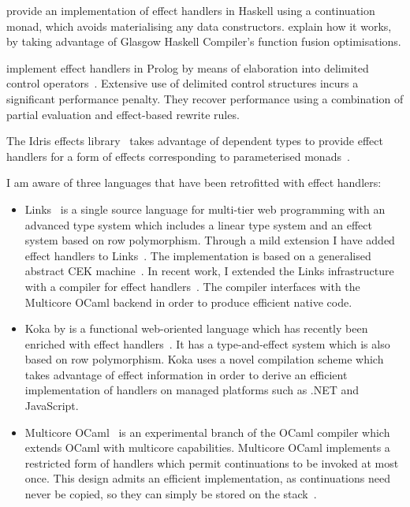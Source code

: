 \documentclass[preprint,9pt,numbers]{sigplanconf}
\begin{document}
\citet{KammarLO13} provide an implementation of effect handlers in
Haskell using a continuation monad, which avoids materialising any
data constructors. \citet{WuS15} explain how it works, by taking
advantage of Glasgow Haskell Compiler's function fusion
optimisations.

\citet{SalehS16} implement effect handlers in Prolog by means of
elaboration into delimited control
operators~\cite{SchrijversDDW13}. Extensive use of delimited control
structures incurs a significant performance penalty. They recover
performance using a combination of partial evaluation and effect-based
rewrite rules.

The Idris effects library~\cite{Brady13,Brady14} takes advantage of dependent
types to provide effect handlers for a form of effects corresponding
to parameterised monads~\cite{Atkey09}.

I am aware of three languages that have been retrofitted with effect
handlers:
\begin{itemize}

\item Links~\cite{CooperLWY06} is a single source language for
  multi-tier web programming with an advanced type system which
  includes a linear type system and an effect system based on row
  polymorphism. Through a mild extension I have added effect handlers
  to Links~\cite{Hillerstrom15,HillerstromL16}. The implementation is
  based on a generalised abstract CEK
  machine~\cite{HillerstromL16}. In recent work, I extended the Links
  infrastructure with a compiler for effect
  handlers~\cite{HillerstromLS16}. The compiler interfaces with the
  Multicore OCaml backend in order to produce efficient native code.

\item Koka by \citet{Leijen14} is a functional web-oriented language
  which has recently been enriched with effect
  handlers~\cite{Leijen17}. It has a type-and-effect system which is
  also based on row polymorphism. Koka uses a novel compilation scheme
  which takes advantage of effect information in order to derive an
  efficient implementation of handlers on managed platforms such as
  .NET and JavaScript.

\item Multicore OCaml~\cite{DolanWSYM15} is an experimental branch of
  the OCaml compiler which extends OCaml with multicore
  capabilities. Multicore OCaml implements a restricted form of
  handlers which permit continuations to be invoked at most once. This
  design admits an efficient implementation, as continuations need
  never be copied, so they can simply be stored on the
  stack~\cite{BruggemanWD96}.

\end{itemize}
\end{document}
